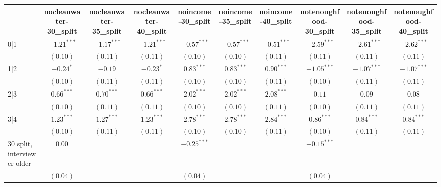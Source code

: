 
\usepackage{booktabs}
\usepackage{threeparttable}

\begin{table}
\begin{center}
\begin{threeparttable}
\begin{tabular}{l c c c c c c c c c}
\toprule
 & nocleanwater-30_split & nocleanwater-35_split & nocleanwater-40_split & noincome-30_split & noincome-35_split & noincome-40_split & notenoughfood-30_split & notenoughfood-35_split & notenoughfood-40_split \\
\midrule
0|1                             & $-1.21^{***}$ & $-1.17^{***}$ & $-1.21^{***}$ & $-0.57^{***}$ & $-0.57^{***}$ & $-0.51^{***}$ & $-2.59^{***}$ & $-2.61^{***}$ & $-2.62^{***}$ \\
                                & $(0.10)$      & $(0.11)$      & $(0.11)$      & $(0.10)$      & $(0.10)$      & $(0.11)$      & $(0.11)$      & $(0.11)$      & $(0.11)$      \\
1|2                             & $-0.24^{*}$   & $-0.19$       & $-0.23^{*}$   & $0.83^{***}$  & $0.83^{***}$  & $0.90^{***}$  & $-1.05^{***}$ & $-1.07^{***}$ & $-1.07^{***}$ \\
                                & $(0.10)$      & $(0.11)$      & $(0.11)$      & $(0.10)$      & $(0.10)$      & $(0.11)$      & $(0.10)$      & $(0.11)$      & $(0.11)$      \\
2|3                             & $0.66^{***}$  & $0.70^{***}$  & $0.66^{***}$  & $2.02^{***}$  & $2.02^{***}$  & $2.08^{***}$  & $0.11$        & $0.09$        & $0.08$        \\
                                & $(0.10)$      & $(0.11)$      & $(0.11)$      & $(0.10)$      & $(0.10)$      & $(0.11)$      & $(0.10)$      & $(0.11)$      & $(0.11)$      \\
3|4                             & $1.23^{***}$  & $1.27^{***}$  & $1.23^{***}$  & $2.78^{***}$  & $2.78^{***}$  & $2.84^{***}$  & $0.86^{***}$  & $0.84^{***}$  & $0.84^{***}$  \\
                                & $(0.10)$      & $(0.11)$      & $(0.11)$      & $(0.10)$      & $(0.10)$      & $(0.11)$      & $(0.10)$      & $(0.11)$      & $(0.11)$      \\
30 split, interviewer older     & $0.00$        &               &               & $-0.25^{***}$ &               &               & $-0.15^{***}$ &               &               \\
                                & $(0.04)$      &               &               & $(0.04)$      &               &               & $(0.04)$      &               &               \\

\end{tabular}
\end{threeparttable}
\end{center}
\end{table}
